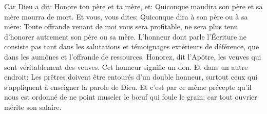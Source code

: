 Car Dieu a dit: Honore ton père et ta mère,
	et: Quiconque maudira son père et sa mère mourra de mort.
Et vous, vous dites:
	Quiconque dira à son père ou à sa mère:
		Toute offrande venant de moi vous sera profitable,
	ne sera plus tenu d’honorer autrement son père ou sa mère.
L’honneur dont parle l’Écriture
	ne consiste pas tant dans les salutations
		et témoignages extérieurs de déférence,
	que dans les aumônes et l’offrande de ressources.
Honorez, dit l’Apôtre, les veuves qui sont véritablement des veuves.
	Cet honneur signifie un don.
Et dans un autre endroit:
	Les prêtres doivent être entourés d’un double honneur,
	surtout ceux qui s’appliquent à enseigner la parole de Dieu.
Et c’est par ce même précepte qu’il nous est ordonné
	de ne point museler le bœuf qui foule le grain;
	car tout ouvrier mérite son salaire.
